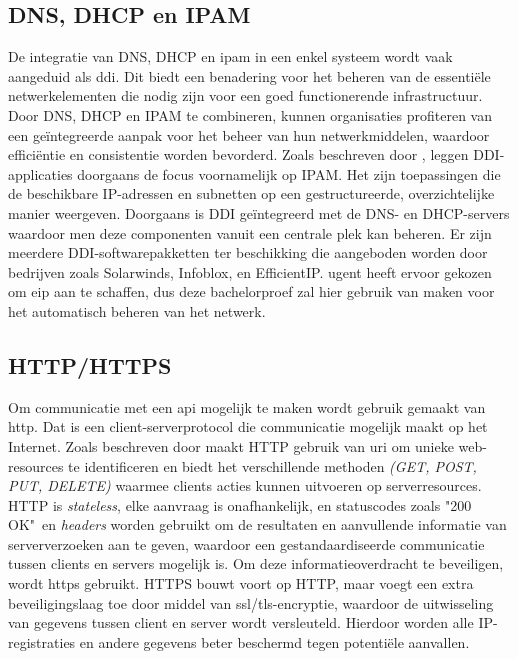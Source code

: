 \subsection{DNS, DHCP en IPAM}
De integratie van DNS, DHCP en \acrshort{ipam} in een enkel systeem wordt vaak aangeduid als \acrshort{ddi}. Dit biedt een benadering voor het beheren van de essentiële netwerkelementen die nodig zijn voor een goed functionerende infrastructuur. Door DNS, DHCP en IPAM te combineren, kunnen organisaties profiteren van een geïntegreerde aanpak voor het beheer van hun netwerkmiddelen, waardoor efficiëntie en consistentie worden bevorderd. Zoals beschreven door \textcite{Fontein2023}, leggen DDI-applicaties doorgaans de focus voornamelijk op IPAM. Het zijn toepassingen die de beschikbare IP-adressen en subnetten op een gestructureerde, overzichtelijke manier weergeven. Doorgaans is DDI geïntegreerd met de DNS- en DHCP-servers waardoor men deze componenten vanuit een centrale plek kan beheren. Er zijn meerdere DDI-softwarepakketten ter beschikking die aangeboden worden door bedrijven zoals Solarwinds, Infoblox, en EfficientIP. \acrshort{ugent} heeft ervoor gekozen om \acrlong{eip} aan te schaffen, dus deze bachelorproef zal hier gebruik van maken voor het automatisch beheren van het netwerk.

\subsection{HTTP/HTTPS}
Om communicatie met een \acrshort{api} mogelijk te maken wordt gebruik gemaakt van \acrfull{http}. Dat is een client-serverprotocol die communicatie mogelijk maakt op het Internet. Zoals beschreven door \textcite{Fielding2014} maakt HTTP gebruik van \acrfull{uri} om unieke web-resources te identificeren en biedt het verschillende methoden \textit{(GET, POST, PUT, DELETE)} waarmee clients acties kunnen uitvoeren op serverresources. HTTP is \textit{stateless}, elke aanvraag is onafhankelijk, en statuscodes zoals "200 OK"\ en \textit{headers} worden gebruikt om de resultaten en aanvullende informatie van serververzoeken aan te geven, waardoor een gestandaardiseerde communicatie tussen clients en servers mogelijk is.
Om deze informatieoverdracht te beveiligen, wordt \acrfull{https} gebruikt. HTTPS bouwt voort op HTTP, maar voegt een extra beveiligingslaag toe door middel van \acrshort{ssl}/\acrshort{tls}-encryptie, waardoor de uitwisseling van gegevens tussen client en server wordt versleuteld. Hierdoor worden alle IP-registraties en andere gegevens beter beschermd tegen potentiële aanvallen.

